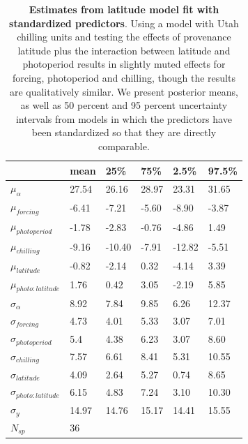 \documentclass{article}
\begin{document}
\begin{footnotesize}
\begin{table}[ht]
\centering
\caption{\textbf{Estimates from latitude model fit with standardized predictors}. Using a model with Utah chilling units and testing the effects of provenance latitude plus the interaction between latitude and photoperiod results in slightly muted effects for forcing, photoperiod and chilling, though the results are qualitatively similar. We present posterior means, as well as 50 percent and 95 percent uncertainty intervals from models in which the predictors have been standardized so that they are directly comparable.} 
\label{tab:lat}
\begingroup\footnotesize
\begin{tabular}{|p{}|p{}p{}p{}p{}p{}|}
  \hline
 & mean & 25\% & 75\% & 2.5\% & 97.5\% \\ 
  \hline
$\mu_{\alpha}$ & 27.54 & 26.16 & 28.97 & 23.31 & 31.65 \\ 
  $\mu_{forcing}$ & -6.41 & -7.21 & -5.60 & -8.90 & -3.87 \\ 
  $\mu_{photoperiod}$ & -1.78 & -2.83 & -0.76 & -4.86 & 1.49 \\ 
  $\mu_{chilling}$ & -9.16 & -10.40 & -7.91 & -12.82 & -5.51 \\ 
  $\mu_{latitude}$ & -0.82 & -2.14 & 0.32 & -4.14 & 3.39 \\ 
  $\mu_{photo:latitude}$ & 1.76 & 0.42 & 3.05 & -2.19 & 5.85 \\ 
  $\sigma_{\alpha}$ & 8.92 & 7.84 & 9.85 & 6.26 & 12.37 \\ 
  $\sigma_{forcing}$ & 4.73 & 4.01 & 5.33 & 3.07 & 7.01 \\ 
  $\sigma_{photoperiod}$ & 5.4 & 4.38 & 6.23 & 3.07 & 8.60 \\ 
  $\sigma_{chilling}$ & 7.57 & 6.61 & 8.41 & 5.31 & 10.55 \\ 
  $\sigma_{latitude}$ & 4.09 & 2.64 & 5.27 & 0.74 & 8.65 \\ 
  $\sigma_{photo:latitude}$ & 6.15 & 4.83 & 7.24 & 3.10 & 10.30 \\ 
  $\sigma_{y}$ & 14.97 & 14.76 & 15.17 & 14.41 & 15.55 \\ 
   \hline
$N_{sp}$ & 36 &  &  &  &  \\ 
   \hline
\end{tabular}
\endgroup
\end{table}


\end{footnotesize}
\end{document}
